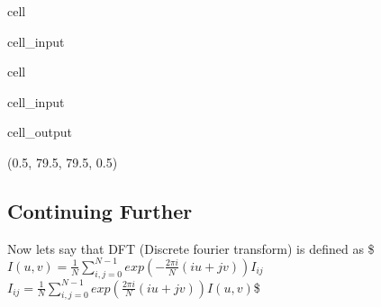 \documentclass[letterpaper,10pt,english]{jupyterBook}
\begin{document}
\begin{sphinxuseclass}{cell}\begin{sphinxVerbatimInput}

\begin{sphinxuseclass}{cell_input}
\begin{sphinxVerbatim}[commandchars=\\\{\}]
\end{sphinxVerbatim}

\end{sphinxuseclass}\end{sphinxVerbatimInput}

\end{sphinxuseclass}
\begin{sphinxuseclass}{cell}\begin{sphinxVerbatimInput}

\begin{sphinxuseclass}{cell_input}
\begin{sphinxVerbatim}[commandchars=\\\{\}]
\end{sphinxVerbatim}

\end{sphinxuseclass}\end{sphinxVerbatimInput}
\begin{sphinxVerbatimOutput}

\begin{sphinxuseclass}{cell_output}
\begin{sphinxVerbatim}[commandchars=\\\{\}]
(\PYGZhy{}0.5, 79.5, 79.5, \PYGZhy{}0.5)
\end{sphinxVerbatim}

\noindent{}

\end{sphinxuseclass}\end{sphinxVerbatimOutput}

\end{sphinxuseclass}

\subsection{Continuing Further}
\label{\detokenize{dirty_gradient:continuing-further}}
\sphinxAtStartPar
Now lets say that DFT (Discrete fourier transform) is defined as
\$\(I(u,v) = \frac{1}{N}\sum^{N-1}_{i,j = 0} exp(-\frac{2\pi i}{N}(iu+jv))I_{ij}\)\(
\)\(I_{ij} = \frac{1}{N}\sum^{N-1}_{i,j = 0} exp(\frac{2\pi i}{N}(iu+jv))I(u,v)\)\$
\end{document}
